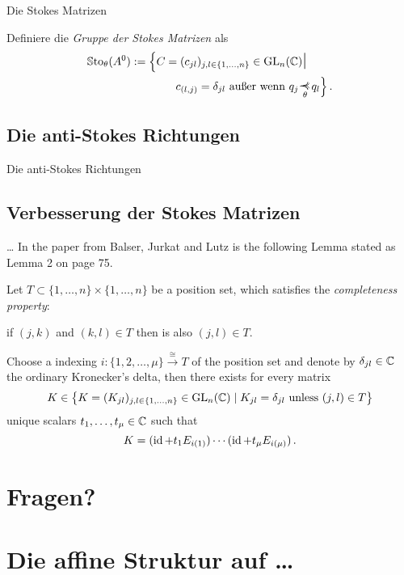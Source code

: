 \begin{frame}[t]{Die Stokes Matrizen}
  \begin{defn}
    Definiere die \emph{Gruppe der Stokes Matrizen} als
    \begin{align*}
      \SSto_\theta(A^0)&:= \Big\{
                         C=(c_{jl})_{j,l\in\{1,\dots,n\}}
                         \in\Gl_n(\C)
                         \mathlarger{\mathlarger{\mid}}
      \\              & \qquad\qquad
                        c_{(l,j)}=\delta_{jl}
                        \text{~außer wenn~}
                        q_j\myrel{\theta}q_l
                        \Big\} \,.
    \end{align*}
  \end{defn}
  \TODO[Beispiel]
\end{frame}

\subsection{Die anti-Stokes Richtungen}
\begin{frame}[t]{Die anti-Stokes Richtungen}

\end{frame}

\subsection{Verbesserung der Stokes Matrizen}
\begin{frame}[t]{\dots}
  In the paper \cite{BJL1979Birkhoff} from Balser, Jurkat and Lutz is the
  following Lemma stated as Lemma 2 on page 75.
  \begin{lem}\label{lem:UniqueDecompositionWotBlocks}
    Let $T\subset\{1,\dots,n\}\times\{1,\dots,n\}$ be a position set, which
    satisfies the \emph{completeness property}:
    \begin{einr}
      if $(j,k)$ and $(k,l)\in T$ then is also $(j,l)\in T$.
    \end{einr}
    Choose a indexing $i:\{1,2,\dots,\mu \} \overset{\cong}{\to}T$ of the
    position set and denote by $\delta_{jl}\in\mathbb{C}$ the ordinary Kronecker's
    delta, then there exists for every matrix
    \[
      K\in \left\{K=(K_{jl})_{j,l\in\{1,\dots,n\}}\in\operatorname{GL}_n(\mathbb{C})\mid
        K_{jl}=\delta_{jl} \text{~unless~} (j,l)\in T \right\}
    \]
    unique scalars $t_1,\dots,t_\mu\in\mathbb{C}$ such that
    \[
      K=(\operatorname{id} + t_1E_{i(1)})\cdots(\operatorname{id} + t_{\mu}E_{i(\mu)}) \,.
    \]
  \end{lem}
\end{frame}

\section*{Fragen?}

\section{Die affine Struktur auf \dots}

